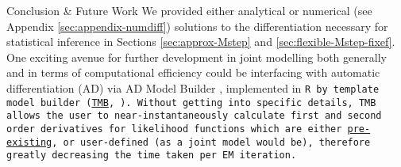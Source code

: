 \begin{chapter}{\label{cha:conclusion}Conclusion \& Future Work}
We provided either analytical or numerical (see Appendix \ref{sec:appendix-numdiff}) solutions to the differentiation necessary for statistical inference in Sections \ref{sec:approx-Mstep} and \ref{sec:flexible-Mstep-fixef}. One exciting avenue for further development in joint modelling both generally and in terms of computational efficiency could be interfacing with automatic differentiation (AD) via AD Model Builder \citep{ADMB-paper}, implemented in \tt{R} by template model builder (\href{https://kaskr.github.io/adcomp/Introduction.html}{\textcolor{nclblue}{\tt{TMB}}}, \citet{R-TMB}). Without getting into specific details, \tt{TMB} allows the user to near-instantaneously calculate first and second order derivatives for likelihood functions which are either \href{https://kaskr.github.io/adcomp/distributions__R_8hpp_source.html}{\textcolor{nclblue}{pre-existing}}, or user-defined (as a joint model would be), therefore greatly decreasing the time taken per EM iteration.

\end{chapter}